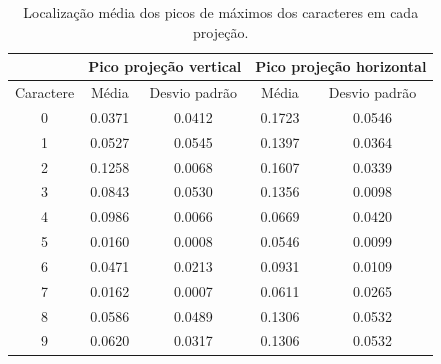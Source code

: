 \documentclass[letterpaper, 10 pt, conference]{ieeeconf}  %
\begin{document}
\begin{table}[h]
\centering
\begin{tabular}{|c|c|c|c|c|}
\hline
          & \multicolumn{2}{c|}{Pico projeção vertical} & \multicolumn{2}{c|}{Pico projeção horizontal} \\ \hline
Caractere & Média             & Desvio padrão           & Média              & Desvio padrão            \\ \hline
0         & 0.0371            & 0.0412                  & 0.1723             & 0.0546                   \\ \hline
1         & 0.0527            & 0.0545                  & 0.1397             & 0.0364                   \\ \hline
2         & 0.1258            & 0.0068                  & 0.1607             & 0.0339                   \\ \hline
3         & 0.0843            & 0.0530                  & 0.1356             & 0.0098                   \\ \hline
4         & 0.0986            & 0.0066                  & 0.0669             & 0.0420                   \\ \hline
5         & 0.0160            & 0.0008                  & 0.0546             & 0.0099                   \\ \hline
6         & 0.0471            & 0.0213                  & 0.0931             & 0.0109                   \\ \hline
7         & 0.0162            & 0.0007                  & 0.0611             & 0.0265                   \\ \hline
8         & 0.0586            & 0.0489                  & 0.1306             & 0.0532                   \\ \hline
9         & 0.0620            & 0.0317                  & 0.1306             & 0.0532                   \\ \hline
\end{tabular}
\caption{Localização média dos picos de máximos dos caracteres em cada
projeção.}
\end{table}
\end{document}
